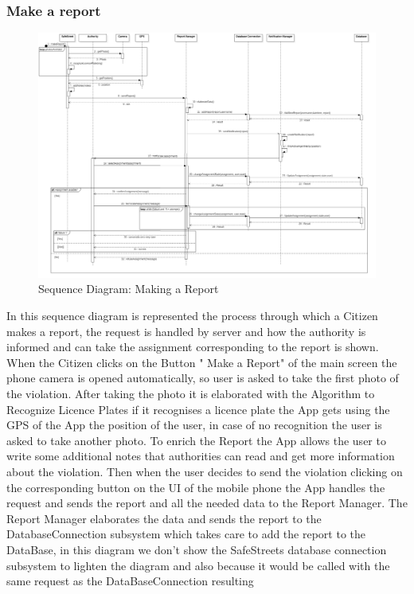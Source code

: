 \subsubsection{Make a report}
\begin{figure}[H]
\centering
\includegraphics[width=\textwidth]{Images/SequenceMakeReport.png}
\caption{\label{fig:ComWI}Sequence Diagram: Making a Report}
\end{figure}
In this sequence diagram is represented the process through which a Citizen makes a report, the request is handled by server and how the authority is informed and can take the assignment corresponding to the report is shown. When the Citizen clicks on the Button " Make a Report" of the main screen the phone camera is opened automatically, so user is asked to take the first photo of the violation. After taking the photo it is elaborated with the Algorithm to Recognize Licence Plates if it recognises a licence plate the App
gets using the GPS of the App the position of the user, in case of no recognition the user is asked
to take another photo. To enrich the Report the App allows the user to write some additional notes that
authorities can read and get more information about the violation. Then when the user decides to send the
violation clicking on the corresponding button on the UI of the mobile phone the App handles the request
and sends the report and all the needed data to the Report Manager. The Report Manager elaborates the
data and sends the report to the DatabaseConnection subsystem which takes care to add the report to the
DataBase, in this diagram we don’t show the SafeStreets database connection subsystem to lighten the
diagram and also because it would be called with the same request as the DataBaseConnection resulting

